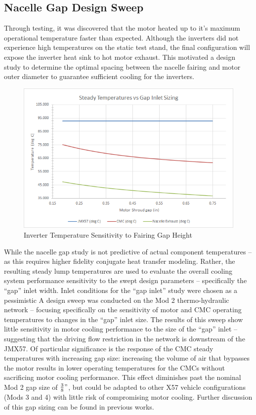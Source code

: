 \documentclass[]{aiaa-tc}%
\begin{document}
\subsection{Nacelle Gap Design Sweep}

Through testing, it was discovered that the motor heated up to it's maximum operational temperature faster than expected. Although the inverters did not experience high temperatures on the static test stand, the final configuration will expose the inverter heat sink to hot motor exhaust. This motivated a design study to determine the optimal spacing between the nacelle fairing and motor outer diameter to guarantee sufficient cooling for the inverters.

\begin{figure}[!htb]%
	\centering
	\includegraphics[width=.75\textwidth]{figures/gapsweep_results.png}
	\caption{Inverter Temperature Sensitivity to Fairing Gap Height}
	\label{fig:GapSweep}
\end{figure}

While the nacelle gap study is not predictive of actual component temperatures – as this requires higher fidelity conjugate heat transfer modeling.  Rather, the resulting steady lump temperatures are used to evaluate the overall cooling system performance sensitivity to the swept design parameters – specifically the “gap” inlet width.  Inlet conditions for the “gap inlet” study were chosen as a pessimistic  
A design sweep was conducted on the Mod 2 thermo-hydraulic network – focusing specifically on the sensitivity of motor and CMC operating temperatures to changes in the “gap” inlet size.  
The results of this sweep show little sensitivity in motor cooling performance to the size of the “gap” inlet – suggesting that the driving flow restriction in the network is downstream of the JMX57.  Of particular significance is the response of the CMC steady temperatures with increasing gap size:  increasing the volume of air that bypasses the motor results in lower operating temperatures for the CMCs without sacrificing motor cooling performance.  This effect diminishes past the nominal Mod 2 gap size of $\frac{3}{8}"$, but could be adapted to other X57 vehicle configurations (Mods 3 and 4) with little risk of compromising motor cooling. Further discussion of this gap sizing can be found in previous works. \cite{Schnulo}
\end{document}
